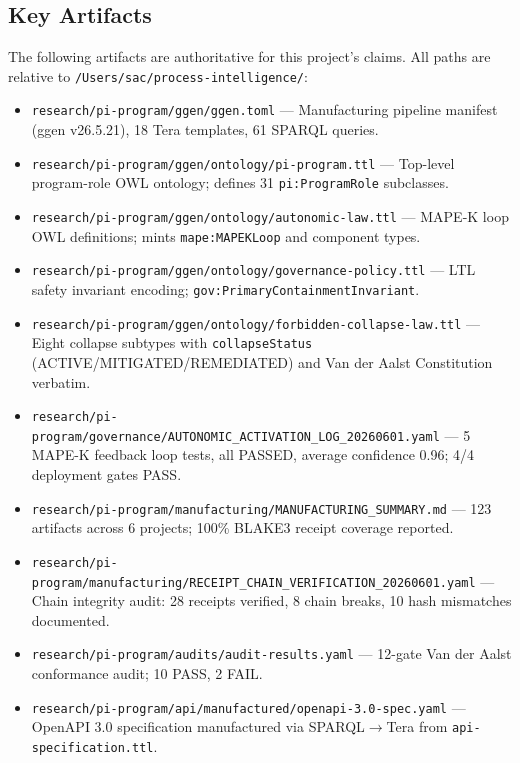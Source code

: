 \subsection{Key Artifacts}
\label{sec:research-pi-program-identity-artifacts}

The following artifacts are authoritative for this project's claims. All paths are relative to \texttt{/Users/sac/process-intelligence/}:

\begin{itemize}
  \item \texttt{research/pi-program/ggen/ggen.toml} --- Manufacturing pipeline manifest (ggen v26.5.21), 18 Tera templates, 61 SPARQL queries.
  \item \texttt{research/pi-program/ggen/ontology/pi-program.ttl} --- Top-level program-role OWL ontology; defines 31 \texttt{pi:ProgramRole} subclasses.
  \item \texttt{research/pi-program/ggen/ontology/autonomic-law.ttl} --- MAPE-K loop OWL definitions; mints \texttt{mape:MAPEKLoop} and component types.
  \item \texttt{research/pi-program/ggen/ontology/governance-policy.ttl} --- LTL safety invariant encoding; \texttt{gov:PrimaryContainmentInvariant}.
  \item \texttt{research/pi-program/ggen/ontology/forbidden-collapse-law.ttl} --- Eight collapse subtypes with \texttt{collapseStatus} (ACTIVE/MITIGATED/REMEDIATED) and Van der Aalst Constitution verbatim.
  \item \texttt{research/pi-program/governance/AUTONOMIC\_ACTIVATION\_LOG\_20260601.yaml} --- 5 MAPE-K feedback loop tests, all PASSED, average confidence 0.96; 4/4 deployment gates PASS.
  \item \texttt{research/pi-program/manufacturing/MANUFACTURING\_SUMMARY.md} --- 123 artifacts across 6 projects; 100\% BLAKE3 receipt coverage reported.
  \item \texttt{research/pi-program/manufacturing/RECEIPT\_CHAIN\_VERIFICATION\_20260601.yaml} --- Chain integrity audit: 28 receipts verified, 8 chain breaks, 10 hash mismatches documented.
  \item \texttt{research/pi-program/audits/audit-results.yaml} --- 12-gate Van der Aalst conformance audit; 10 PASS, 2 FAIL.
  \item \texttt{research/pi-program/api/manufactured/openapi-3.0-spec.yaml} --- OpenAPI 3.0 specification manufactured via SPARQL$\to$Tera from \texttt{api-specification.ttl}.
\end{itemize}
